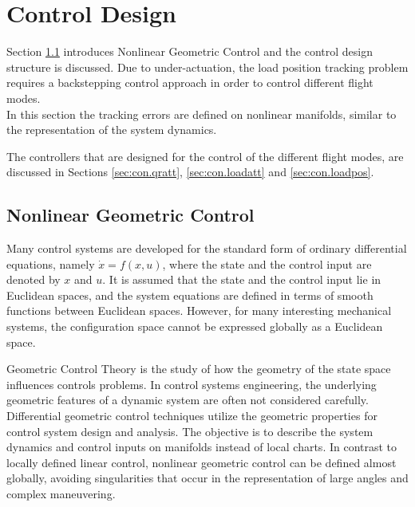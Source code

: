 \chapter{Control Design} \label{ch:control}
Section \ref{sec:con.nlgc} introduces Nonlinear Geometric Control and the control design structure is discussed. Due to under-actuation, the load position tracking problem requires a backstepping control approach in order to control different flight modes.\\
In this section the tracking errors are defined on nonlinear manifolds, similar to the representation of the system dynamics.

The controllers that are designed for the control of the different flight modes, are discussed in Sections \ref{sec:con.qratt}, \ref{sec:con.loadatt} and \ref{sec:con.loadpos}. 


\section{Nonlinear Geometric Control}\label{sec:con.nlgc}
Many control systems are developed for the standard form of ordinary differential equations, namely $ \dot{x}=f(x,u) $, where the state and the control input are denoted by $ x $ and $ u $. It is assumed that the state and the control input lie in Euclidean spaces, and the system equations are defined in terms of smooth functions between Euclidean spaces. However, for many interesting mechanical systems, the configuration space cannot be expressed globally as a Euclidean space.

Geometric Control Theory is the study of how the geometry of the state space influences controls problems. 
In control systems engineering, the underlying geometric features of a dynamic system are often not considered carefully. 
Differential geometric control techniques utilize the geometric properties for control system design and analysis.
The objective is to describe the system dynamics and control inputs on manifolds instead of local charts. In contrast to locally defined linear control, nonlinear geometric control can be defined almost globally, avoiding singularities that occur in the representation of large angles and complex maneuvering.

